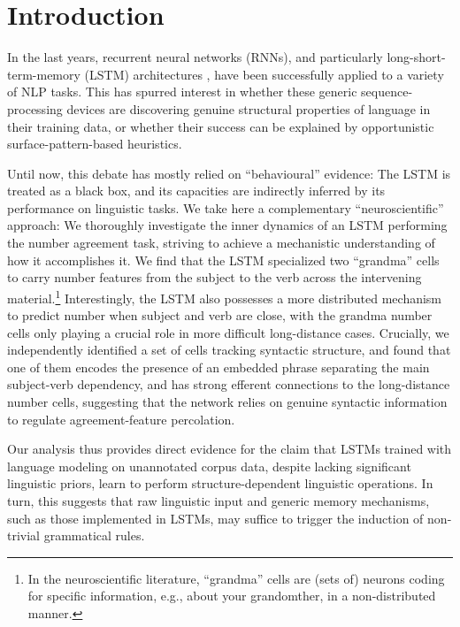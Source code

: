 \section{Introduction}

In the last years, recurrent neural networks (RNNs), and particularly
long-short-term-memory (LSTM) architectures
\cite{Hochreiter:Schmidhuber:1997}, have been successfully applied to
a variety of NLP tasks. This has spurred interest in whether these
generic sequence-processing devices are discovering genuine structural
properties of language in their training data, or whether their
success can be explained by opportunistic surface-pattern-based
heuristics.

Until now, this debate has mostly relied on ``behavioural'' evidence:
The LSTM is treated as a black box, and its capacities are indirectly
inferred by its performance on linguistic tasks. We take here a
complementary ``neuroscientific'' approach: We thoroughly investigate
the inner dynamics of an LSTM performing the number agreement task,
striving to achieve a mechanistic understanding of how it accomplishes
it. We find that the LSTM specialized two ``grandma'' cells
\cite{Bowers:2009} to carry number features from the subject to the
verb across the intervening material.\footnote{In the neuroscientific
  literature, ``grandma'' cells are (sets of) neurons coding for
  specific information, e.g., about your grandomther, in a
  non-distributed manner.} Interestingly, the LSTM also
possesses a more distributed mechanism to predict number when subject
and verb are close, with the grandma number cells only playing a
crucial role in more difficult long-distance cases. Crucially, we
independently identified a set of cells tracking syntactic structure,
and found that one of them encodes the presence of an embedded phrase
separating the main subject-verb dependency, and has strong efferent
connections to the long-distance number cells, suggesting that the
network relies on genuine syntactic information to regulate
agreement-feature percolation.

Our analysis thus provides direct evidence for the claim that LSTMs
trained with language modeling on unannotated corpus data, despite
lacking significant linguistic priors, learn to perform
structure-dependent linguistic operations. In turn, this suggests that
raw linguistic input and generic memory mechanisms, such as those
implemented in LSTMs, may suffice to trigger the induction of
non-trivial grammatical rules.



